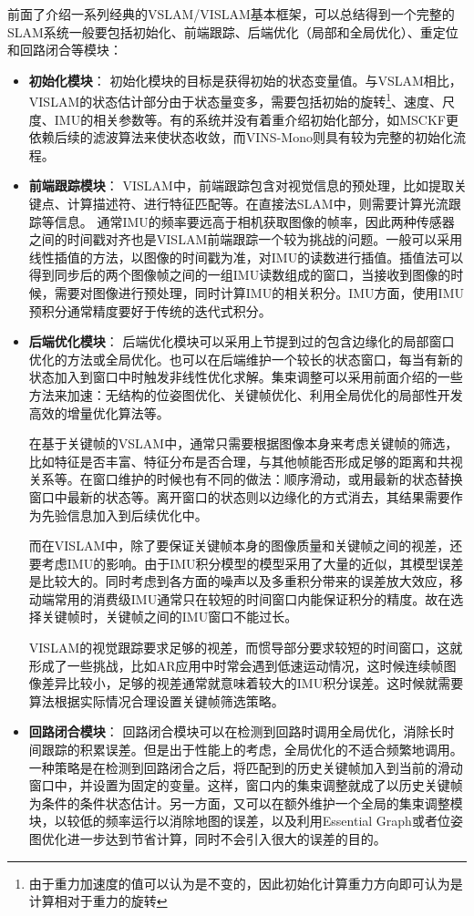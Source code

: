 前面了介绍一系列经典的VSLAM/VISLAM基本框架，可以总结得到一个完整的SLAM系统一般要包括初始化、前端跟踪、后端优化（局部和全局优化）、重定位和回路闭合等模块：
\begin{itemize}
    \item \textbf{初始化模块}：
    初始化模块的目标是获得初始的状态变量值。与VSLAM相比，VISLAM的状态估计部分由于状态量变多，需要包括初始的旋转\footnote{由于重力加速度的值可以认为是不变的，因此初始化计算重力方向即可认为是计算相对于重力的旋转}、速度、尺度、IMU的相关参数等。有的系统并没有着重介绍初始化部分，如MSCKF更依赖后续的滤波算法来使状态收敛，而VINS-Mono则具有较为完整的初始化流程。

    \item \textbf{前端跟踪模块}：
    VISLAM中，前端跟踪包含对视觉信息的预处理，比如提取关键点、计算描述符、进行特征匹配等。在直接法SLAM中，则需要计算光流跟踪等信息。
    通常IMU的频率要远高于相机获取图像的帧率，因此两种传感器之间的时间戳对齐也是VISLAM前端跟踪一个较为挑战的问题。一般可以采用线性插值的方法，以图像的时间戳为准，对IMU的读数进行插值。插值法可以得到同步后的两个图像帧之间的一组IMU读数组成的窗口，当接收到图像的时候，需要对图像进行预处理，同时计算IMU的相关积分。IMU方面，使用IMU预积分通常精度要好于传统的迭代式积分。

    \item \textbf{后端优化模块}：
        后端优化模块可以采用上节提到过的包含边缘化的局部窗口优化的方法或全局优化。也可以在后端维护一个较长的状态窗口，每当有新的状态加入到窗口中时触发非线性优化求解。集束调整可以采用前面介绍的一些方法来加速：无结构的位姿图优化、关键帧优化、利用全局优化的局部性开发高效的增量优化算法等。

        在基于关键帧的VSLAM中，通常只需要根据图像本身来考虑关键帧的筛选，比如特征是否丰富、特征分布是否合理，与其他帧能否形成足够的距离和共视关系等。在窗口维护的时候也有不同的做法：顺序滑动，或用最新的状态替换窗口中最新的状态等。离开窗口的状态则以边缘化的方式消去，其结果需要作为先验信息加入到后续优化中。

    而在VISLAM中，除了要保证关键帧本身的图像质量和关键帧之间的视差，还要考虑IMU的影响。由于IMU积分模型的模型采用了大量的近似，其模型误差是比较大的。同时考虑到各方面的噪声以及多重积分带来的误差放大效应，移动端常用的消费级IMU通常只在较短的时间窗口内能保证积分的精度。故在选择关键帧时，关键帧之间的IMU窗口不能过长。

    VISLAM的视觉跟踪要求足够的视差，而惯导部分要求较短的时间窗口，这就形成了一些挑战，比如AR应用中时常会遇到低速运动情况，这时候连续帧图像差异比较小，足够的视差通常就意味着较大的IMU积分误差。这时候就需要算法根据实际情况合理设置关键帧筛选策略。

    \item \textbf{回路闭合模块}：
    回路闭合模块可以在检测到回路时调用全局优化，消除长时间跟踪的积累误差。但是出于性能上的考虑，全局优化的不适合频繁地调用。一种策略是在检测到回路闭合之后，将匹配到的历史关键帧加入到当前的滑动窗口中，并设置为固定的变量。这样，窗口内的集束调整就成了以历史关键帧为条件的条件状态估计。另一方面，又可以在额外维护一个全局的集束调整模块，以较低的频率运行以消除地图的误差，以及利用Essential Graph或者位姿图优化进一步达到节省计算，同时不会引入很大的误差的目的。

\end{itemize}

